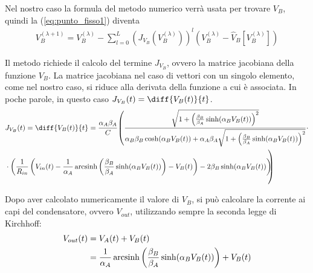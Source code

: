 	Nel nostro caso la formula del metodo numerico verrà usata per trovare $V_{B}$, quindi la (\ref{eq:punto_fisso1}) diventa
	\begin{equation}
		\label{eq:punto_fisso2}
		\begin{split}
			V_{B}^{(\lambda+1)} = V_{B}^{(\lambda)}-\sum_{l=0}^{L} \left(J_{V_{B}}(V_{B}^{(\lambda)})\right)^{l}(V_{B}^{(\lambda)}-\widehat V_{B}[V_{B}^{(\lambda)}])
		\end{split}
	\end{equation}
	
	Il metodo richiede il calcolo del termine $J_{V_{B}}$, ovvero la matrice jacobiana della funzione $V_{B}$. La matrice jacobiana nel caso di vettori con un singolo elemento, come nel nostro caso, si riduce alla derivata della funzione a cui è associata. In poche parole, in questo caso $J_{V_{B}}(t) = \diff{V_{B}(t)}{t}$.
	\begin{equation}
		\label{eq:jacobiana}
		\begin{split}
			&J_{V_{B}}(t) = \diff{V_{B}(t)}{t} = \frac{\alpha_{A}\beta_{A}}{C}\reallybig(\frac{\sqrt{1+\left(\frac{\beta_{B}}{\beta_{A}}\sinh(\alpha_{B}V_{B}(t))\right)^{2}}}{\alpha_{B}\beta_{B}\cosh(\alpha_{B}V_{B}(t))+\alpha_{A}\beta_{A}\sqrt{1+\left(\frac{\beta_{B}}{\beta_{A}}\sinh(\alpha_{B}V_{B}(t))\right)^{2}}}\cdot\\&\cdot\left(\frac{1}{R_{in}}\left(V_{in}(t)-\frac{1}{\alpha_{A}} \arcsinh \left(\frac{\beta_{B}}{\beta_{A}} \sinh(\alpha_{B}V_{B}(t))\right)-V_{B}(t)\right)-2\beta_{B}\sinh(\alpha_{B}V_{B}(t))\right)\hspace{-7px}\reallybig)
		\end{split}
	\end{equation}
	
	Dopo aver calcolato numericamente il valore di $V_{B}$, si può calcolare la corrente ai capi del condensatore, ovvero $V_{out}$, utilizzando sempre la seconda legge di Kirchhoff:
	\begin{equation}
		\label{eq:tensione_finale}
		\begin{split}
			V_{out}(t) &= V_{A}(t)+V_{B}(t)\\
			&= \frac{1}{\alpha_{A}} \operatorname{arcsinh} \left(\frac{\beta_{B}}{\beta_{A}} \sinh(\alpha_{B}V_{B}(t))\right)+V_{B}(t)
		\end{split}
	\end{equation}
